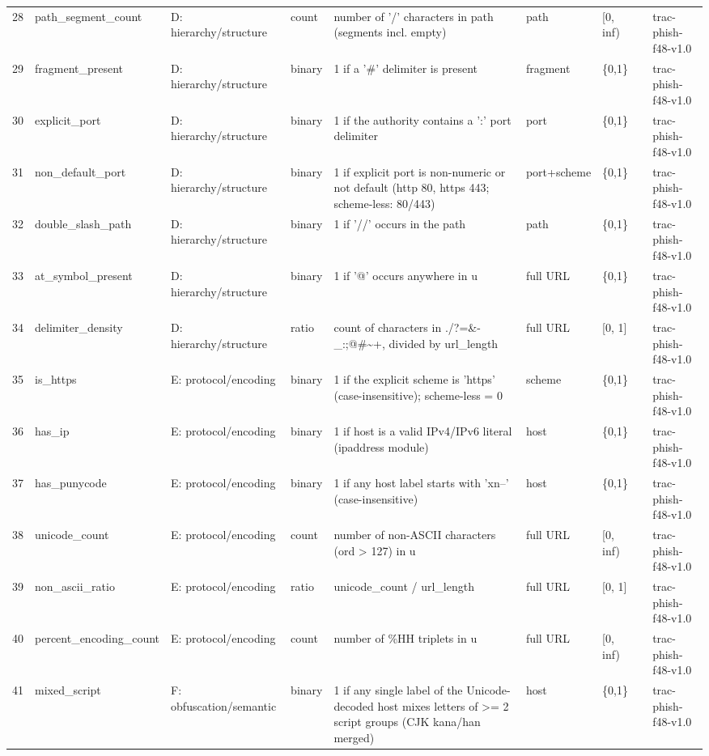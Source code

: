 \begin{tabular}{rllllllll}
28 & path\_segment\_count & D: hierarchy/structure & count & number of '/' characters in path (segments incl. empty) & path & [0, inf) &  & trac-phish-f48-v1.0 \\
29 & fragment\_present & D: hierarchy/structure & binary & 1 if a '\#' delimiter is present & fragment & \{0,1\} &  & trac-phish-f48-v1.0 \\
30 & explicit\_port & D: hierarchy/structure & binary & 1 if the authority contains a ':' port delimiter & port & \{0,1\} &  & trac-phish-f48-v1.0 \\
31 & non\_default\_port & D: hierarchy/structure & binary & 1 if explicit port is non-numeric or not default (http 80, https 443; scheme-less: 80/443) & port+scheme & \{0,1\} &  & trac-phish-f48-v1.0 \\
32 & double\_slash\_path & D: hierarchy/structure & binary & 1 if '//' occurs in the path & path & \{0,1\} &  & trac-phish-f48-v1.0 \\
33 & at\_symbol\_present & D: hierarchy/structure & binary & 1 if '@' occurs anywhere in u & full URL & \{0,1\} &  & trac-phish-f48-v1.0 \\
34 & delimiter\_density & D: hierarchy/structure & ratio & count of characters in ./?=\&-\_:;@\#\textasciitilde +, divided by url\_length & full URL & [0, 1] &  & trac-phish-f48-v1.0 \\
35 & is\_https & E: protocol/encoding & binary & 1 if the explicit scheme is 'https' (case-insensitive); scheme-less = 0 & scheme & \{0,1\} &  & trac-phish-f48-v1.0 \\
36 & has\_ip & E: protocol/encoding & binary & 1 if host is a valid IPv4/IPv6 literal (ipaddress module) & host & \{0,1\} &  & trac-phish-f48-v1.0 \\
37 & has\_punycode & E: protocol/encoding & binary & 1 if any host label starts with 'xn--' (case-insensitive) & host & \{0,1\} &  & trac-phish-f48-v1.0 \\
38 & unicode\_count & E: protocol/encoding & count & number of non-ASCII characters (ord > 127) in u & full URL & [0, inf) &  & trac-phish-f48-v1.0 \\
39 & non\_ascii\_ratio & E: protocol/encoding & ratio & unicode\_count / url\_length & full URL & [0, 1] &  & trac-phish-f48-v1.0 \\
40 & percent\_encoding\_count & E: protocol/encoding & count & number of \%HH triplets in u & full URL & [0, inf) &  & trac-phish-f48-v1.0 \\
41 & mixed\_script & F: obfuscation/semantic & binary & 1 if any single label of the Unicode-decoded host mixes letters of >= 2 script groups (CJK kana/han merged) & host & \{0,1\} &  & trac-phish-f48-v1.0 \\

\end{tabular}
